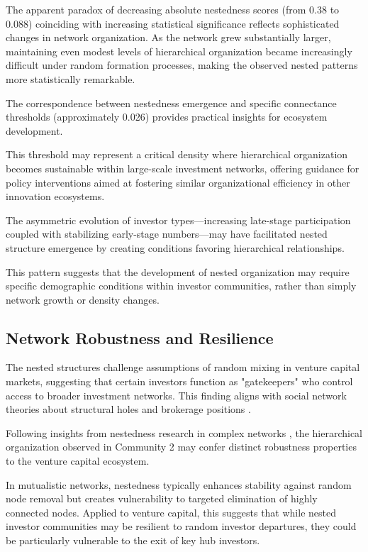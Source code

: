 The apparent paradox of decreasing absolute nestedness scores (from 0.38 to 0.088) coinciding with increasing statistical significance reflects sophisticated changes in network organization. As the network grew substantially larger, maintaining even modest levels of hierarchical organization became increasingly difficult under random formation processes, making the observed nested patterns more statistically remarkable. 


The correspondence between nestedness emergence and specific connectance thresholds (approximately 0.026) provides practical insights for ecosystem development. 

This threshold may represent a critical density where hierarchical organization becomes sustainable within large-scale investment networks, offering guidance for policy interventions aimed at fostering similar organizational efficiency in other innovation ecosystems.

The asymmetric evolution of investor types—increasing late-stage participation coupled with stabilizing early-stage numbers—may have facilitated nested structure emergence by creating conditions favoring hierarchical relationships. 

This pattern suggests that the development of nested organization may require specific demographic conditions within investor communities, rather than simply network growth or density changes.

\subsection{Network Robustness and Resilience}

The nested structures challenge assumptions of random mixing in venture capital markets, suggesting that certain investors function as "gatekeepers" who control access to broader investment networks. This finding aligns with social network theories about structural holes and brokerage positions \cite{Borgatti2011}.

Following insights from nestedness research in complex networks \cite{Mariani2019}, the hierarchical organization observed in Community 2 may confer distinct robustness properties to the venture capital ecosystem. 

In mutualistic networks, nestedness typically enhances stability against random node removal but creates vulnerability to targeted elimination of highly connected nodes. Applied to venture capital, this suggests that while nested investor communities may be resilient to random investor departures, they could be particularly vulnerable to the exit of key hub investors.

